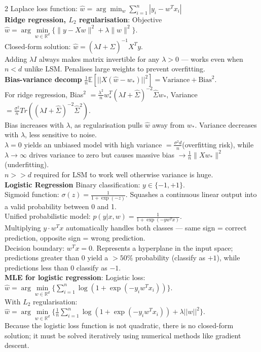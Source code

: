 \documentclass[10pt]{article}
\begin{document}
\begin{multicols*}{2}
Laplace loss function: $\hat{w} = \arg \min_w \sum_{i=1}^n |y_i - w^T x_i|$\\
\textbf{Ridge regression, $L_2$ regularisation}: Objective $\hat{w} = \arg\min\limits_{w\in\mathbb{R}^d}\{\|y-Xw\|^2+\lambda\|w\|^2\}$.\\
Closed-form solution: $\hat{w}=(\lambda I + \hat{\Sigma})^{-1}X^T y$.\\
Adding $\lambda I$ always makes matrix invertible for any $\lambda > 0$ — works even when $n < d$ unlike LSM. Penalises large weights to prevent overfitting.\\
\textbf{Bias-variance decomp} $\frac{1}{n}\mathbb{E}[||X(\hat{w} - w_*)||^2] = \text{Variance} + \text{Bias}^2$.\\
For ridge regression, Bias$^2$ $= \frac{\lambda^2}{n}w_*^T (\lambda I + \hat{\Sigma})^{-2}\hat{\Sigma}w_*$, Variance $= \frac{\sigma^2}{n}Tr((\lambda I + \hat{\Sigma})^{-2}\hat{\Sigma}^2)$.\\
Bias increases with $\lambda$, as regularisation pulls $\hat{w}$ away from $w_*$. Variance decreases with $\lambda$, less sensitive to noise.\\
$\lambda=0$ yields an unbiased model with high variance $= \frac{\sigma^2 d}{n}$(overfitting risk), while $\lambda \to \infty$ drives variance to zero but causes massive bias $\to \frac{1}{n}\|Xw_*\|^2$ (underfitting).\\
$n>>d$ required for LSM to work well otherwise variance is huge.\\
\textbf{Logistic Regression} Binary classification: $y\in\{-1,+1\}$.\\
Sigmoid function: $\sigma(z) = \frac{1}{1 + \exp(-z)}$. Squashes a continuous linear output into a valid probability between 0 and 1.\\
Unified probabilistic model: $p(y|x,w) = \frac{1}{1 + \exp(-yw^T x)}$.\\
Multiplying $y\cdot w^Tx$ automatically handles both classes — same sign = correct prediction, opposite sign = wrong prediction.\\
Decision boundary: $w^T x = 0$. Represents a hyperplane in the input space; predictions greater than 0 yield a $>50\%$ probability (classify as $+1$), while predictions less than 0 classify as $-1$.\\
\textbf{MLE for logistic regression}: Logistic loss: $\hat{w} = \arg \min\limits_{w\in\mathbb{R}^d} \{\sum_{i=1}^n \log(1 + \exp(-y_i w^T x_i))\}$.\\
With $L_2$ regularisation: $\hat{w} = \arg \min\limits_{w\in\mathbb{R}^d} \{\frac{1}{n}\sum_{i=1}^n \log(1 + \exp(-y_i w^T x_i)) + \lambda||w||^2\}$.\\
Because the logistic loss function is not quadratic, there is no closed-form solution; it must be solved iteratively using numerical methods like gradient descent.

\end{multicols*}
\end{document}
